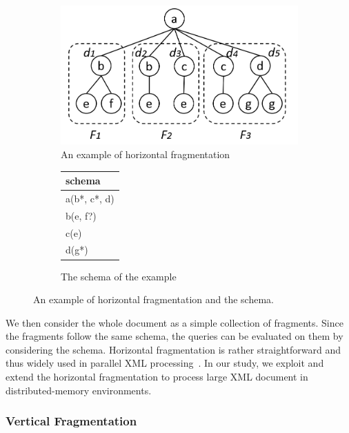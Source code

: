 \begin{figure}[t]
	\centering
	\begin{subfigure}{.6\textwidth}
		\centering
		\includegraphics[width=.99\linewidth]{figures/hfrag_example}
		\caption{An example of horizontal fragmentation}
		\label{fig:sub1}
	\end{subfigure}%
	\begin{subfigure}{.4\textwidth}
		\centering
		\vspace{12mm}
		\begin{tabular}{|l|}
			\hline
			schema\\
			\hline
			a(b*, c*, d) \\
			b(e, f?) \\
			c(e) \\
			d(g*) \\
			\hline
		\end{tabular}
		\vspace{12mm}
		\caption{The schema of the example}
		\label{fig:sub2}
	\end{subfigure}
	\caption{An example of horizontal fragmentation and the schema.}
	\label{fig:hfrag_example}
\end{figure}

We then consider the whole document as a simple collection of fragments. Since
the fragments follow the same schema, the queries can be evaluated on them by
considering the schema. Horizontal fragmentation is rather straightforward and
thus widely used in parallel XML processing~\cite{DaGP14,BoLS09,AfDG15,CCMN15}.
In our study, we exploit and extend the horizontal fragmentation to process
large  XML document in distributed-memory environments.

\subsubsection{Vertical Fragmentation} \label{sec:vfragment}

